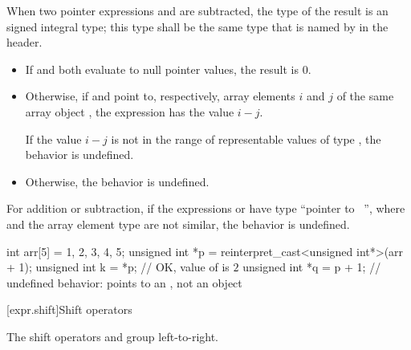 \pnum
{}%
%
%
%
When two pointer expressions  and  are subtracted,
the type of the result is an  signed
integral type; this type shall be the same type that is named by
 in the 
header.
\begin{itemize}
\item If  and  both evaluate to null pointer values,
the result is 0.
\item Otherwise, if  and  point to, respectively,
array elements $i$ and $j$
of the same array object ,
the expression  has the value $i - j$.
\begin{note}
If the value $i - j$
is not in the range of representable values
of type ,
the behavior is undefined.
\end{note}
\item Otherwise, the behavior is undefined.
\end{itemize}

\pnum
For addition or subtraction, if the expressions  or  have
type ``pointer to \cv{}~'', where  and the array element type
are not similar, the behavior is undefined.
\begin{example}
\begin{codeblock}
int arr[5] = {1, 2, 3, 4, 5};
unsigned int *p = reinterpret_cast<unsigned int*>(arr + 1);
unsigned int k = *p;            // OK, value of  is $2$
unsigned int *q = p + 1;        // undefined behavior:  points to an , not an  object
\end{codeblock}
\end{example}

[expr.shift]{Shift operators}

\pnum
{}%
%
%
%
%
%
The shift operators \tcode{<<} and \tcode{>>} group left-to-right.

